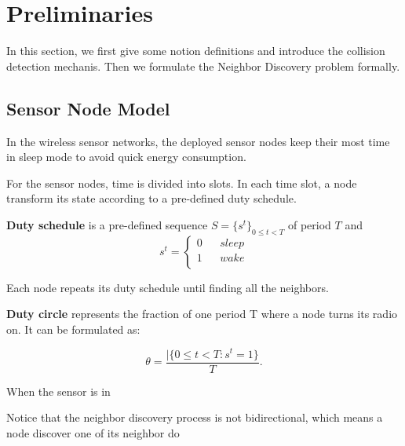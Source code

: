 \section{Preliminaries}
\label{sectionmodel}


In this section, we first give some notion definitions and introduce the collision detection mechanis. Then we formulate the Neighbor Discovery problem formally.  



\subsection{Sensor Node Model}


In the wireless sensor networks, the deployed sensor nodes keep their most time in sleep mode to avoid quick energy consumption.

For the sensor nodes, time is divided into slots. In each time slot, a node transform its state according to a pre-defined duty schedule.

\begin{definition}
\textbf{Duty schedule} is a pre-defined sequence $S=\{s^t\}_{0\leq t<T}$ of period $T$ and
$$ s^t=\left\{
\begin{aligned}
0  & & {sleep}\\
1  &  &{wake }\\
\end{aligned}
\right.
$$
\end{definition}

Each node repeats its duty schedule until finding all the neighbors.

\begin{definition}
\textbf{Duty circle} represents the fraction of one period T where a node turns its radio on. It can be formulated as:

$$\theta=\frac{|\{ 0\leq t<T : s^t =1\}}{T}.
$$
  
\end{definition}

When the sensor is in 

Notice that the neighbor discovery process is not bidirectional, which means a node discover one of its neighbor do







